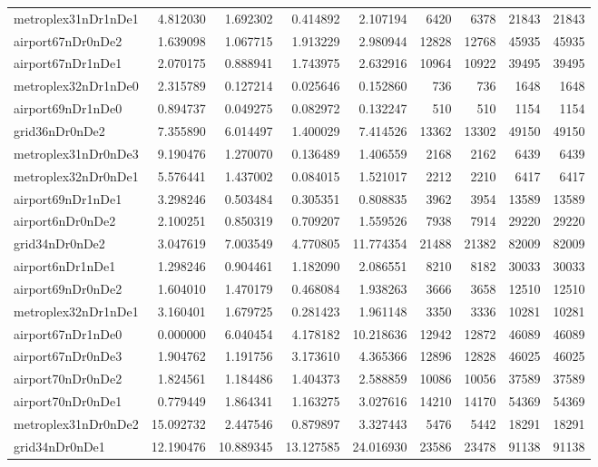 \begin{longtable}{|l|r|r|r|r|r|r|r|r|}
metroplex31nDr1nDe1 & 4.812030 & 1.692302 & 0.414892 & 2.107194 & 6420 & 6378 & 21843 & 21843 \\
airport67nDr0nDe2 & 1.639098 & 1.067715 & 1.913229 & 2.980944 & 12828 & 12768 & 45935 & 45935 \\
airport67nDr1nDe1 & 2.070175 & 0.888941 & 1.743975 & 2.632916 & 10964 & 10922 & 39495 & 39495 \\
metroplex32nDr1nDe0 & 2.315789 & 0.127214 & 0.025646 & 0.152860 & 736 & 736 & 1648 & 1648 \\
airport69nDr1nDe0 & 0.894737 & 0.049275 & 0.082972 & 0.132247 & 510 & 510 & 1154 & 1154 \\
grid36nDr0nDe2 & 7.355890 & 6.014497 & 1.400029 & 7.414526 & 13362 & 13302 & 49150 & 49150 \\
metroplex31nDr0nDe3 & 9.190476 & 1.270070 & 0.136489 & 1.406559 & 2168 & 2162 & 6439 & 6439 \\
metroplex32nDr0nDe1 & 5.576441 & 1.437002 & 0.084015 & 1.521017 & 2212 & 2210 & 6417 & 6417 \\
airport69nDr1nDe1 & 3.298246 & 0.503484 & 0.305351 & 0.808835 & 3962 & 3954 & 13589 & 13589 \\
airport6nDr0nDe2 & 2.100251 & 0.850319 & 0.709207 & 1.559526 & 7938 & 7914 & 29220 & 29220 \\
grid34nDr0nDe2 & 3.047619 & 7.003549 & 4.770805 & 11.774354 & 21488 & 21382 & 82009 & 82009 \\
airport6nDr1nDe1 & 1.298246 & 0.904461 & 1.182090 & 2.086551 & 8210 & 8182 & 30033 & 30033 \\
airport69nDr0nDe2 & 1.604010 & 1.470179 & 0.468084 & 1.938263 & 3666 & 3658 & 12510 & 12510 \\
metroplex32nDr1nDe1 & 3.160401 & 1.679725 & 0.281423 & 1.961148 & 3350 & 3336 & 10281 & 10281 \\
airport67nDr1nDe0 & 0.000000 & 6.040454 & 4.178182 & 10.218636 & 12942 & 12872 & 46089 & 46089 \\
airport67nDr0nDe3 & 1.904762 & 1.191756 & 3.173610 & 4.365366 & 12896 & 12828 & 46025 & 46025 \\
airport70nDr0nDe2 & 1.824561 & 1.184486 & 1.404373 & 2.588859 & 10086 & 10056 & 37589 & 37589 \\
airport70nDr0nDe1 & 0.779449 & 1.864341 & 1.163275 & 3.027616 & 14210 & 14170 & 54369 & 54369 \\
metroplex31nDr0nDe2 & 15.092732 & 2.447546 & 0.879897 & 3.327443 & 5476 & 5442 & 18291 & 18291 \\
grid34nDr0nDe1 & 12.190476 & 10.889345 & 13.127585 & 24.016930 & 23586 & 23478 & 91138 & 91138 \\

\end{longtable}
